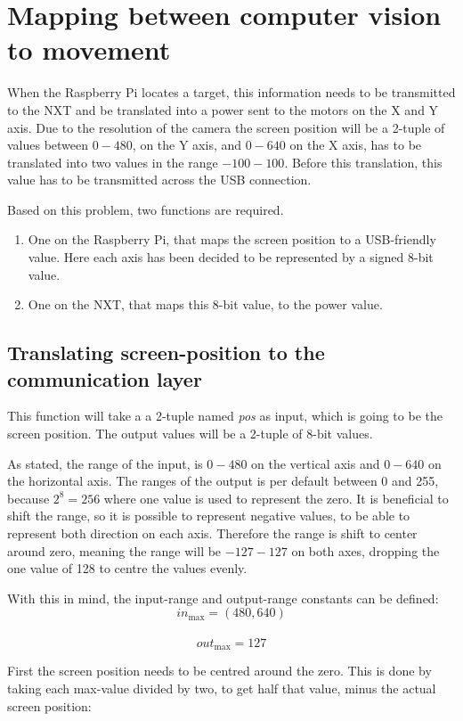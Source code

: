 \section{Mapping between computer vision to movement}
When the Raspberry Pi locates a target, this information needs to be transmitted to the NXT and be translated into a power sent to the motors on the X and Y axis. Due to the resolution of the camera the screen position will be a 2-tuple of values between $0 - 480$, on the Y axis, and $0 - 640$ on the X axis, has to be translated into two values in the range $-100 - 100$.
Before this translation, this value has to be transmitted across the USB connection.

Based on this problem, two functions are required. 
\begin{enumerate}
	\item One on the Raspberry Pi, that maps the screen position to a USB-friendly value. Here each axis has been decided to be represented by a signed 8-bit value.
	\item One on the NXT, that maps this 8-bit value, to the power value.
\end{enumerate}


\subsection{Translating screen-position to the communication layer}
This function will take a a 2-tuple named \textit{pos} as input, which is going to be the screen position.
The output values will be a 2-tuple of 8-bit values.

As stated, the range of the input, is $0 - 480$ on the vertical axis and $0 - 640$ on the horizontal axis.
The ranges of the output is per default between 0 and 255, because $2^8 = 256 $ where one value is used to represent the zero.
It is beneficial to shift the range, so it is possible to represent negative values, to be able to represent both direction on each axis.
Therefore the range is shift to center around zero, meaning the range will be $-127 - 127$ on both axes, dropping the one value of 128 to centre the values evenly.

With this in mind, the input-range and output-range constants can be defined:\\
$$in_\text{max} = (480,640)$$\\
$$out_\text{max} = 127$$

First the screen position needs to be centred around the zero. This is done by taking each max-value divided by two, to get half that value, minus the actual screen position:

